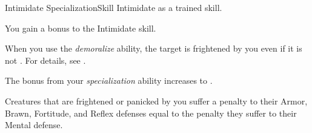 



  \begin{feat}{Intimidate Specialization}{Skill}
    \featpre Intimidate as a trained skill.

     You gain a  bonus to the Intimidate skill.

     When you use the \textit{demoralize} ability, the target is frightened by you even if it is not .
    For details, see .

     The bonus from your \textit{specialization} ability increases to .

     Creatures that are frightened or panicked by you suffer a penalty to their Armor, Brawn, Fortitude, and Reflex defenses equal to the penalty they suffer to their Mental defense.
  \end{feat}

